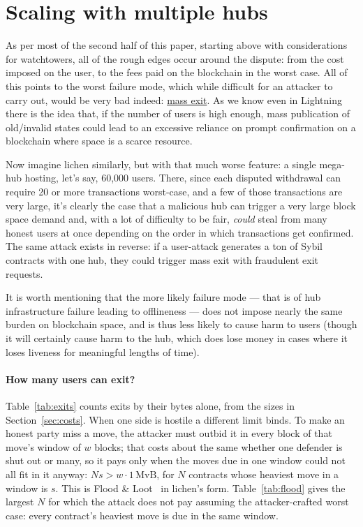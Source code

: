 \documentclass[11pt]{article}
\begin{document}
\section{Scaling with multiple hubs}
\label{sec:multihub}

As per most of the second half of this paper, starting above with considerations for watchtowers, all of the rough edges occur around the dispute: from the cost imposed on the user, to the fees paid on the blockchain in the worst case. All of this points to the worst failure mode, which while difficult for an attacker to carry out, would be very bad indeed: \underline{mass exit}. As we know even in Lightning there is the idea that, if the number of users is high enough, mass publication of old/invalid states could lead to an excessive reliance on prompt confirmation on a blockchain where space is a scarce resource.

Now imagine lichen similarly, but with that much worse feature: a single mega-hub hosting, let's say, 60,000 users. There, since each disputed withdrawal can require 20 or more transactions worst-case, and a few of those transactions are very large, it's clearly the case that a malicious hub can trigger a very large block space demand and, with a lot of difficulty to be fair, \emph{could} steal from many honest users at once depending on the order in which transactions get confirmed. The same attack exists in reverse: if a user-attack generates a ton of Sybil contracts with one hub, they could trigger mass exit with fraudulent exit requests.

It is worth mentioning that the more likely failure mode --- that is of hub infrastructure failure leading to offlineness --- does not impose nearly the same burden on blockchain space, and is thus less likely to cause harm to users (though it will certainly cause harm to the hub, which does lose money in cases where it loses liveness for meaningful lengths of time).

\paragraph{How many users can exit?} Table~\ref{tab:exits} counts exits
by their bytes alone, from the sizes in Section~\ref{sec:costs}. When one
side is hostile a different limit binds. To make an honest party miss a
move, the attacker must outbid it in every block of that move's window
of $w$ blocks; that costs about the same whether one defender is shut out
or many, so it pays only when the moves due in one window could not all
fit in it anyway: $N s > w \cdot 1\,\mathrm{MvB}$, for $N$ contracts
whose heaviest move in a window is $s$. This is Flood \&
Loot~\cite{floodloot} in lichen's form. Table~\ref{tab:flood} gives the
largest $N$ for which the attack does not pay assuming the attacker-crafted worst case: every contract's heaviest move is due in the same window.
\end{document}
